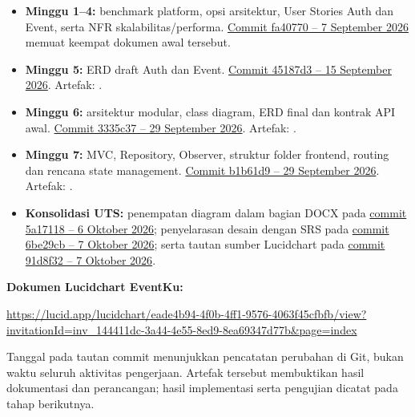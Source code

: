 \documentclass[11pt,a4paper]{article}
\begin{document}
\begin{itemize}
\item \textbf{Minggu 1--4:} benchmark platform, opsi arsitektur, User Stories Auth dan Event, serta NFR skalabilitas/performa. \href{https://github.com/alexabilxiz/UAS_PROJEK_RPL_EventKu/commit/fa407702c0a555e109fd62b0334c1e7bf31ccb7a}{Commit fa40770 -- 7 September 2026} memuat keempat dokumen awal tersebut.
\item \textbf{Minggu 5:} ERD draft Auth dan Event. \href{https://github.com/alexabilxiz/UAS_PROJEK_RPL_EventKu/commit/45187d3631b18825ec0d9d8726ee71e35b880a91}{Commit 45187d3 -- 15 September 2026}. Artefak: .
\item \textbf{Minggu 6:} arsitektur modular, class diagram, ERD final dan kontrak API awal. \href{https://github.com/alexabilxiz/UAS_PROJEK_RPL_EventKu/commit/3335c379c7e3749b07a9053d4fdb41adefecca5c}{Commit 3335c37 -- 29 September 2026}. Artefak: .
\item \textbf{Minggu 7:} MVC, Repository, Observer, struktur folder frontend, routing dan rencana state management. \href{https://github.com/alexabilxiz/UAS_PROJEK_RPL_EventKu/commit/b1b61d91d2ae04b912279c6b65a53a5d8ebbc02d}{Commit b1b61d9 -- 29 September 2026}. Artefak: .
\item \textbf{Konsolidasi UTS:} penempatan diagram dalam bagian DOCX pada \href{https://github.com/alexabilxiz/UAS_PROJEK_RPL_EventKu/commit/5a171188a8d9fac6df4662edcaa03187cae87be2}{commit 5a17118 -- 6 Oktober 2026}; penyelarasan desain dengan SRS pada \href{https://github.com/alexabilxiz/UAS_PROJEK_RPL_EventKu/commit/6be29cb3f5501b5a5d37ef284735be488d700c82}{commit 6be29cb -- 7 Oktober 2026}; serta tautan sumber Lucidchart pada \href{https://github.com/alexabilxiz/UAS_PROJEK_RPL_EventKu/commit/91d8f32b8f10ea8ed19f023c9fa0ee036bffc7ec}{commit 91d8f32 -- 7 Oktober 2026}.
\end{itemize}

\textbf{Dokumen Lucidchart EventKu:}
{\small\raggedright\url{https://lucid.app/lucidchart/eade4b94-4f0b-4ff1-9576-4063f45cfbfb/view?invitationId=inv_144411dc-3a44-4e55-8ed9-8ea69347d77b&page=index}\par}

Tanggal pada tautan commit menunjukkan pencatatan perubahan di Git, bukan waktu seluruh aktivitas pengerjaan. Artefak tersebut membuktikan hasil dokumentasi dan perancangan; hasil implementasi serta pengujian dicatat pada tahap berikutnya.
\end{document}
